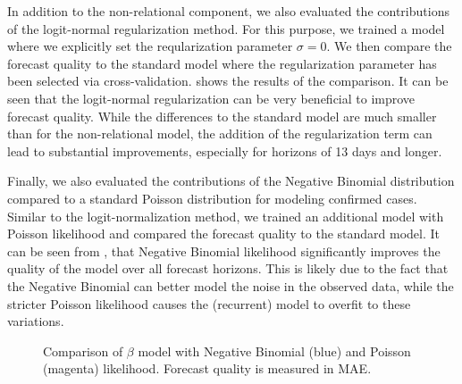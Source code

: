 \documentclass{article}
\newcommand{\bAR}{\ensuremath{\beta}\text{-AR}\xspace}
\begin{document}
In addition to the non-relational component, we also evaluated the contributions
of the logit-normal regularization method. For this purpose, we trained a model
where we explicitly set the reqularization parameter \(\sigma = 0\). We then
compare the forecast quality to the standard model where the regularization
parameter has been selected via cross-validation. 
shows the results of the comparison. It can be seen that the logit-normal
regularization can be very beneficial to improve forecast quality. While the
differences to the standard model are much smaller than for the non-relational
model, the addition of the regularization term can lead to substantial
improvements, especially for horizons of 13 days and longer.

Finally, we also evaluated the contributions of the Negative Binomial
distribution compared to a standard Poisson distribution for modeling confirmed
cases. Similar to the logit-normalization method, we trained an additional model
with Poisson likelihood and compared the forecast quality to the standard model.
It can be seen from , that Negative Binomial likelihood
significantly improves the quality of the model over all forecast horizons. This
is likely due to the fact that the Negative Binomial can better model the noise
in the observed data, while the stricter Poisson likelihood causes the
(recurrent) model to overfit to these variations.

\begin{figure}[t]
\centering
\caption{\label{fig:mae-covidhub-loss}Comparison of \bAR model with Negative Binomial (blue) and Poisson (magenta) likelihood. Forecast quality is measured in MAE.}
\end{figure}
\end{document}
